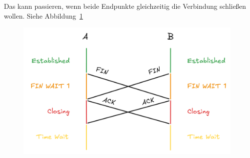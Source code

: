 \begin{enumerate}[(a)]
        Das kann passieren, wenn beide Endpunkte gleichzeitig die Verbindung
        schließen wollen. Siehe Abbildung~\ref{fig:5.11.b}

        \begin{figure}[p]
            \centering
            \includegraphics[width=1\textwidth]{./assets/5.11.b.png}
            \caption{}
            \label{fig:5.11.b}
        \end{figure}
\end{enumerate}

\FloatBarrier
